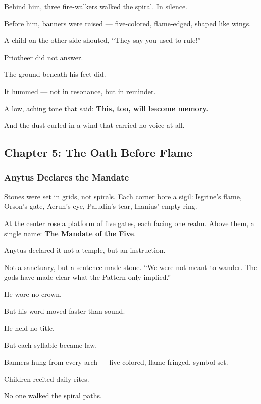 \documentclass[12pt]{article}
\begin{document}
Behind him, three fire-walkers walked the spiral.  
In silence.

Before him, banners were raised —  
five-colored, flame-edged, shaped like wings.

A child on the other side shouted,  
 “They say you used to rule!”

Priotheer did not answer.

The ground beneath his feet did.

It hummed —  
not in resonance,  
but in reminder.

A low, aching tone  
that said:  
 \textbf{This, too, will become memory.}

And the dust curled in a wind  
that carried no voice at all.

\newpage

\subsection*{Chapter 5: The Oath Before Flame}

\vspace{.5in}

\subsubsection*{Anytus Declares the Mandate}

Stones were set in grids, not spirals.  
Each corner bore a sigil:  
Isgrine’s flame, Orson’s gate, Aerun’s eye, Paludin’s tear, Inanius’ empty ring.

At the center rose a platform of five gates, each facing one realm.  
Above them, a single name: \textbf{The Mandate of the Five}.

Anytus declared it not a temple, but an instruction.  

Not a sanctuary, but a sentence made stone.  
 “We were not meant to wander.  
 The gods have made clear what the Pattern only implied.”

He wore no crown.  

But his word moved faster than sound.  

He held no title.  

But each syllable became law.

Banners hung from every arch — five-colored, flame-fringed, symbol-set.  

Children recited daily rites.  

No one walked the spiral paths.  
\end{document}

